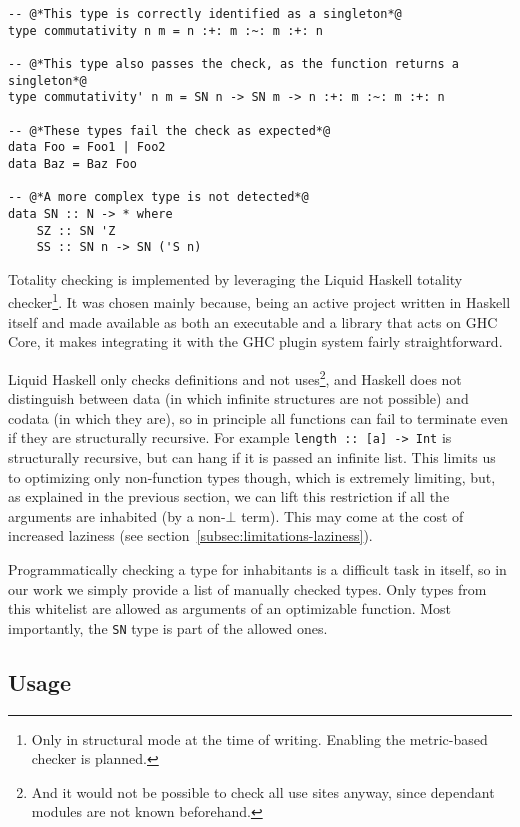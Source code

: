 \begin{lstlisting}[caption=Some examples of singleton detection]
-- @*This type is correctly identified as a singleton*@
type commutativity n m = n :+: m :~: m :+: n

-- @*This type also passes the check, as the function returns a singleton*@
type commutativity' n m = SN n -> SN m -> n :+: m :~: m :+: n

-- @*These types fail the check as expected*@
data Foo = Foo1 | Foo2
data Baz = Baz Foo

-- @*A more complex type is not detected*@
data SN :: N -> * where
    SZ :: SN 'Z
    SS :: SN n -> SN ('S n)
\end{lstlisting}

Totality checking is implemented by leveraging the Liquid Haskell\cite{refinement-types-for-haskell} totality checker\footnote{Only in structural mode at the time of writing. Enabling the metric-based checker is planned.}.
It was chosen mainly because, being an active project written in Haskell itself and made available as both an executable and a library that acts on GHC Core, it makes integrating it with the GHC plugin system fairly straightforward.

Liquid Haskell only checks definitions and not uses\footnote{And it would not be possible to check all use sites anyway, since dependant modules are not known beforehand.}, and Haskell does not distinguish between data (in which infinite structures are not possible) and codata (in which they are), so in principle all functions can fail to terminate even if they are structurally recursive. For example \texttt{length :: [a] -> Int} is structurally recursive, but can hang if it is passed an infinite list.
This limits us to optimizing only non-function types though, which is extremely limiting, but, as explained in the previous section, we can lift this restriction if all the arguments are inhabited (by a non-$\bot$ term).
This may come at the cost of increased laziness (see section~\ref{subsec:limitations-laziness}).

Programmatically checking a type for inhabitants is a difficult task in itself, so in our work we simply provide a list of manually checked types.
Only types from this whitelist are allowed as arguments of an optimizable function.
Most importantly, the \texttt{SN} type is part of the allowed ones.

\subsection{Usage}
\label{subsec:usage}

